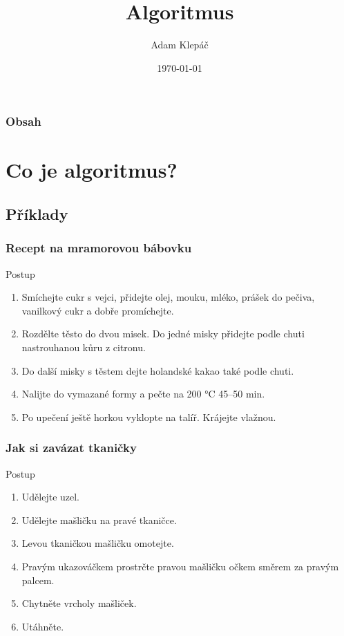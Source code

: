 \documentclass[aspectratio=169,11pt,svgnames]{beamer}
\title{Algoritmus}
\date{\today}
\author{Adam Klepáč}
\institute[GEVO]{Gymnázium Evolution Jižní Město}
\begin{document}
\titleframe

\begin{frame}
 \frametitle{Obsah}
 \tableofcontents
\end{frame}

\section{Co je algoritmus?}
\subsection{Příklady}

\begin{frame}
 \subsectionpage
\end{frame}

\begin{frame}
 \frametitle{Recept na mramorovou bábovku}
 \begin{block}{Postup}
  \begin{enumerate}
   \item Smíchejte cukr s vejci, přidejte olej, mouku, mléko, prášek do pečiva,
    vanilkový cukr a dobře promíchejte.
   \item Rozdělte těsto do dvou misek. Do jedné misky přidejte podle chuti
    nastrouhanou kůru z citronu.
   \item Do další misky s těstem dejte holandské kakao také podle chuti.
   \item Nalijte do vymazané formy a pečte na 200 °C 45–50 min.
   \item Po upečení ještě horkou vyklopte na talíř. Krájejte vlažnou.
  \end{enumerate}
 \end{block}
\end{frame}

\begin{frame}
 \frametitle{Jak si zavázat tkaničky}
 \begin{block}{Postup}
  \begin{enumerate}
   \item Udělejte uzel.
   \item Udělejte mašličku na pravé tkaničce.
   \item Levou tkaničkou mašličku omotejte.
   \item Pravým ukazováčkem prostrčte pravou mašličku očkem směrem za pravým
    palcem.
   \item Chytněte vrcholy mašliček.
   \item Utáhněte.
  \end{enumerate}
 \end{block}
\end{frame}
\end{document}
